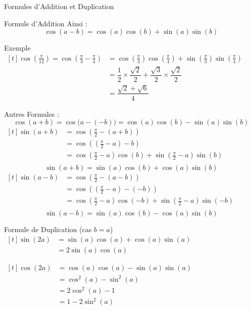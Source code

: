\documentclass{cours}
\let\frac\tfrac %
\begin{document}
\begin{Gpartie}{Formules d'Addition et Duplication}
\begin{Spartie}{Formule d'Addition}
            Ainsi : \[\cos(a-b)=\cos(a)\cos(b)+\sin(a)\sin(b)\]
            \begin{SSpartie}{Exemple} 
                $\begin{aligned}[t]
                    \cos\left(\frac{\pi}{12}\right)=\cos\left(\frac{\pi}{3}-\frac{\pi}{4}\right) &= \cos\left(\frac{\pi}{3}\right)\cos\left(\frac{\pi}{4}\right)+\sin\left(\frac{\pi}{3}\right)\sin\left(\frac{\pi}{4}\right) \\
                    &= \dfrac{1}{2}\times\dfrac{\sqrt{2}}{2}+\dfrac{\sqrt{3}}{2}\times\dfrac{\sqrt{2}}{2} \\
                    &= \dfrac{\sqrt{2}+\sqrt{6}}{4}
                \end{aligned}$
            \end{SSpartie}
            Autres Formules :
            \[\cos(a+b)=\cos\big(a-(-b)\big)=\cos(a)\cos(b)-\sin(a)\sin(b)\]
            $\begin{aligned}[t]
                \sin(a+b) &= \cos\left(\frac{\pi}{2}-(a+b)\right) \\
                &= \cos\left(\left(\frac{\pi}{2}-a\right)-b\right) \\
                &= \cos\left(\frac{\pi}{2}-a\right)\cos(b)+\sin\left(\frac{\pi}{2}-a\right)\sin(b) \\
            \end{aligned}$
            \[\sin(a+b)=\sin(a)\cos(b)+\cos(a)\sin(b)\]
            $\begin{aligned}[t]
                \sin(a-b) &= \cos\left(\frac{\pi}{2}-(a-b)\right) \\
                &= \cos\left(\left(\frac{\pi}{2}-a\right)-(-b)\right) \\
                &= \cos\left(\frac{\pi}{2}-a\right)\cos(-b)+\sin\left(\frac{\pi}{2}-a\right)\sin(-b) \\
            \end{aligned}$
            \[\sin(a-b)=\sin(a)\cos(b)-\cos(a)\sin(b)\]
        \end{Spartie}
        \begin{Spartie}{Formule de Duplication (cas $b=a$)} 
            $\begin{aligned}[t]
                \sin(2a) &= \sin(a)\cos(a)+\cos(a)\sin(a) \\
                &=2\sin(a)\cos(a)
            \end{aligned}$

            $\begin{aligned}[t]
                \cos(2a) &= \cos(a)\cos(a)-\sin(a)\sin(a) \\
                &=\cos^2(a)-\sin^2(a) \\
                &= 2\cos^2(a)-1 \\ 
                &= 1-2\sin^2(a)
            \end{aligned}$


\end{Spartie}
\end{Gpartie}
\end{document}
